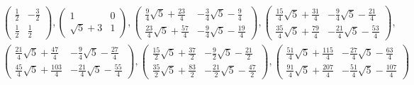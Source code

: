 \documentclass{amsart}
\begin{document}
\begin{align*}
&\left(\begin{array}{rr}
\frac{1}{2} & -\frac{3}{2} \\
\frac{1}{2} & \frac{1}{2}
\end{array}\right), \left(\begin{array}{rr}
1 & 0 \\
 \sqrt{5} + 3 & 1
\end{array}\right), \left(\begin{array}{rr}
\frac{9}{4}  \sqrt{5} + \frac{23}{4} & -\frac{3}{4}  \sqrt{5} - \frac{9}{4} \\
\frac{23}{4}  \sqrt{5} + \frac{57}{4} & -\frac{9}{4}  \sqrt{5} - \frac{19}{4}
\end{array}\right), \left(\begin{array}{rr}
\frac{15}{4}  \sqrt{5} + \frac{31}{4} & -\frac{9}{4}  \sqrt{5} - \frac{21}{4} \\
\frac{35}{4}  \sqrt{5} + \frac{79}{4} & -\frac{21}{4}  \sqrt{5} - \frac{53}{4}
\end{array}\right), \\
& \left(\begin{array}{rr}
\frac{21}{4}  \sqrt{5} + \frac{47}{4} & -\frac{9}{4}  \sqrt{5} - \frac{27}{4} \\
\frac{45}{4}  \sqrt{5} + \frac{103}{4} & -\frac{21}{4}  \sqrt{5} - \frac{55}{4}
\end{array}\right), \left(\begin{array}{rr}
\frac{15}{2}  \sqrt{5} + \frac{37}{2} & -\frac{9}{2}  \sqrt{5} - \frac{21}{2} \\
\frac{35}{2}  \sqrt{5} + \frac{83}{2} & -\frac{21}{2}  \sqrt{5} - \frac{47}{2}
\end{array}\right), \left(\begin{array}{rr}
\frac{51}{4}  \sqrt{5} + \frac{115}{4} & -\frac{27}{4}  \sqrt{5} - \frac{63}{4} \\
\frac{91}{4}  \sqrt{5} + \frac{207}{4} & -\frac{51}{4}  \sqrt{5} - \frac{107}{4}
\end{array}\right)
\end{align*}
\end{document}
